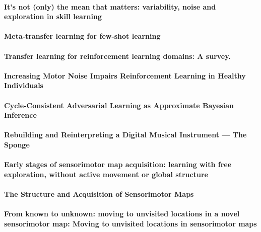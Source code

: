 \documentclass[11pt]{article}
\begin{document}
\paragraph{It's not (only) the mean that matters: variability, noise and exploration in skill learning} \citep{sternad_its_2018}

\paragraph{Meta-transfer learning for few-shot learning} \citep{sun_meta-transfer_2019}

\paragraph{Transfer learning for reinforcement learning domains: A survey.} \citep{taylor_transfer_2009}

\paragraph{Increasing Motor Noise Impairs Reinforcement Learning in Healthy Individuals} \citep{therrien_increasing_2018}

\paragraph{Cycle-Consistent Adversarial Learning as Approximate Bayesian Inference} \citep{tiao_cycle-consistent_2018}

\paragraph{Rebuilding and Reinterpreting a Digital Musical Instrument — The Sponge} \citep{tom_rebuilding_2019}

\paragraph{Early stages of sensorimotor map acquisition: learning with free exploration, without active movement or global structure} \citep{van_vugt_early_2019}

\paragraph{The Structure and Acquisition of Sensorimotor Maps} \citep{van_vugt_structure_2018}

\paragraph{From known to unknown: moving to unvisited locations in a novel sensorimotor map: Moving to unvisited locations in sensorimotor maps} \citep{van_vugt_known_2018}
\end{document}
